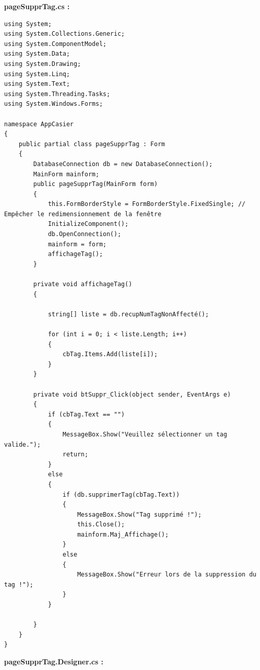 \documentclass[main.tex]{subfiles}
\begin{document}
\textbf{pageSupprTag.cs :}

\begin{lstlisting}
using System;
using System.Collections.Generic;
using System.ComponentModel;
using System.Data;
using System.Drawing;
using System.Linq;
using System.Text;
using System.Threading.Tasks;
using System.Windows.Forms;

namespace AppCasier
{
    public partial class pageSupprTag : Form
    {
        DatabaseConnection db = new DatabaseConnection();
        MainForm mainform;
        public pageSupprTag(MainForm form)
        {
            this.FormBorderStyle = FormBorderStyle.FixedSingle; // Empêcher le redimensionnement de la fenêtre
            InitializeComponent();
            db.OpenConnection();
            mainform = form;
            affichageTag();
        }

        private void affichageTag()
        {

            string[] liste = db.recupNumTagNonAffecté();

            for (int i = 0; i < liste.Length; i++)
            {
                cbTag.Items.Add(liste[i]);
            }
        }

        private void btSuppr_Click(object sender, EventArgs e)
        {
            if (cbTag.Text == "")
            {
                MessageBox.Show("Veuillez sélectionner un tag valide.");
                return;
            }
            else
            {
                if (db.supprimerTag(cbTag.Text))
                {
                    MessageBox.Show("Tag supprimé !");
                    this.Close();
                    mainform.Maj_Affichage();
                }
                else
                {
                    MessageBox.Show("Erreur lors de la suppression du tag !");
                }
            }

        }
    }
}
\end{lstlisting}

\textbf{pageSupprTag.Designer.cs :}
\end{document}
